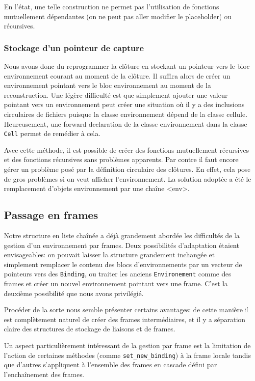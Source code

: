 \documentclass[a4paper,11pt]{article}
\begin{document}
En l'état, une telle construction ne permet pas l'utilisation de fonctions
mutuellement dépendantes (on ne peut pas aller modifier le placeholder) ou
récursives.

\subsubsection{Stockage d'un pointeur de capture}

Nous avons donc du reprogrammer la clôture en stockant un pointeur vers le bloc
environnement courant au moment de la clôture. Il suffira alors de créer un
environnement pointant vers le bloc environnement au moment de la reconstruction.
Une légère difficulté est que simplement ajouter une valeur pointant vers un
environnement peut créer une situation où il y a des inclusions circulaires de
fichiers puisque la classe environnement dépend de la classe cellule.
Heureusement, une forward declaration de la classe environnement dans la classe
\texttt{Cell} permet de remédier à cela.

Avec cette méthode, il est possible de créer des fonctions mutuellement
récursives et des fonctions récursives sans problèmes apparents. Par contre il
faut encore gérer un problème posé par la définition circulaire des clôtures.
En effet, cela pose de gros problèmes si on veut afficher l'environnement. La
solution adoptée a été le remplacement d'objets environnement par une chaîne
<env>.

\subsection{Passage en frames}

Notre structure en liste chaînée a déjà grandement abordée les difficultés de la
gestion d'un environnement par frames. Deux possibilités d'adaptation étaient
envisageables: on pouvait laisser la structure grandement inchangée et
simplement remplacer le contenu des blocs d'environnements par un vecteur de
pointeurs vers des \texttt{Binding}, ou traiter les anciens
\texttt{Environement} comme des frames et créer un nouvel environnement pointant
vers une frame. C'est la deuxième possibilité que nous avons privilégié.

Procéder de la sorte nous semble présenter certains avantages: de cette manière
il est complètement naturel de créer des frames intermédiaires, et il y a
séparation claire des structures de stockage de liaisons et de frames.

Un aspect particulièrement intéressant de la gestion par frame est la limitation
de l'action de certaines méthodes (comme \texttt{set\_new\_binding}) à la frame
locale tandis que d'autres s'appliquent à l'ensemble des frames en cascade
défini par l'enchaînement des frames.
\end{document}
